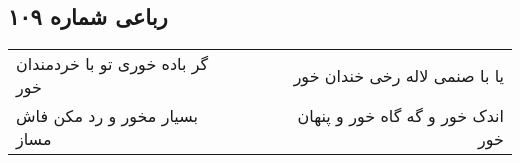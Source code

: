 \begin{center}
\section*{رباعی شماره ۱۰۹}
\label{sec:sh109}
\begin{longtable}{l p{0.5cm} r}
گر باده خوری تو با خردمندان خور
&&
یا با صنمی لاله رخی خندان خور
\\
بسیار مخور و رد مکن فاش مساز
&&
اندک خور و گه گاه خور و پنهان خور
\\
\end{longtable}
\end{center}
